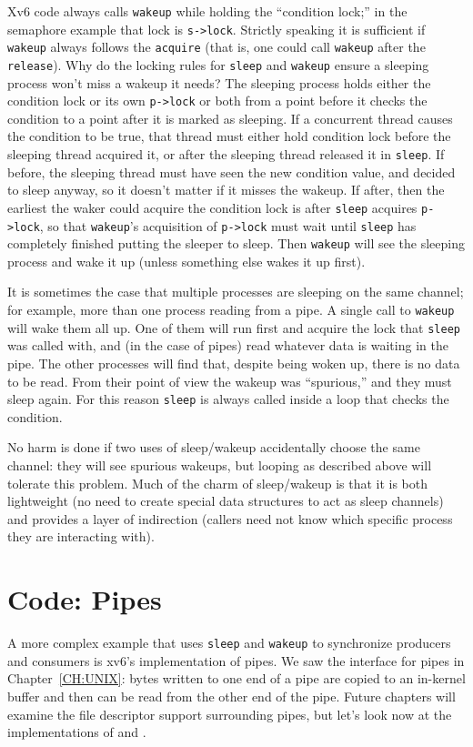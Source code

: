 Xv6 code always calls
\lstinline{wakeup}
while holding the ``condition lock;''
in the semaphore example that lock is
\lstinline{s->lock}.
Strictly speaking it is sufficient if
\lstinline{wakeup}
always follows the
\lstinline{acquire}
(that is, one could call
\lstinline{wakeup}
after the
\lstinline{release}).
Why do the locking rules for 
\lstinline{sleep}
and
\lstinline{wakeup}
ensure a sleeping process won't miss a wakeup it needs?
The sleeping process holds either
the condition lock or its own
\lstinline{p->lock} 
or both from a point before it checks the condition
to a point after it is marked as sleeping.
If a concurrent thread causes the condition to be true,
that thread must either hold condition lock before the
sleeping thread acquired it, or after the sleeping
thread released it in
\lstinline{sleep}.
If before, the sleeping thread must have seen the new condition
value, and decided to sleep anyway, so it doesn't matter
if it misses the wakeup.
If after, then the earliest the waker could acquire the
condition lock is after
\lstinline{sleep}
acquires
\lstinline{p->lock},
so that
\lstinline{wakeup}'s
acquisition of
\lstinline{p->lock}
must wait until
\lstinline{sleep}
has completely finished putting the sleeper to sleep.
Then 
\lstinline{wakeup}
will see the sleeping process and wake it up
(unless something else wakes it up first).

It is sometimes the case that multiple processes are sleeping
on the same channel; for example, more than one process
reading from a pipe.
A single call to 
\lstinline{wakeup}
will wake them all up.
One of them will run first and acquire the lock that
\lstinline{sleep}
was called with, and (in the case of pipes) read whatever
data is waiting in the pipe.
The other processes will find that, despite being woken up,
there is no data to be read.
From their point of view the wakeup was ``spurious,'' and
they must sleep again.
For this reason \lstinline{sleep} is always called inside a loop that
checks the condition.

No harm is done if two uses of sleep/wakeup accidentally
choose the same channel: they will see spurious wakeups,
but looping as described above will tolerate this problem.
Much of the charm of sleep/wakeup is that it is both
lightweight (no need to create special data
structures to act as sleep channels) and provides a layer
of indirection (callers need not know which specific process
they are interacting with).
\section{Code: Pipes}
A more complex example that uses \lstinline{sleep}
and \lstinline{wakeup} to synchronize producers and
consumers is xv6's implementation of pipes.
We saw the interface for pipes in Chapter~\ref{CH:UNIX}:
bytes written to one end of a pipe are copied
to an in-kernel buffer and then can be read from
the other end of the pipe.
Future chapters will examine the file descriptor support
surrounding pipes, but let's look now at the
implementations of 
and
.

